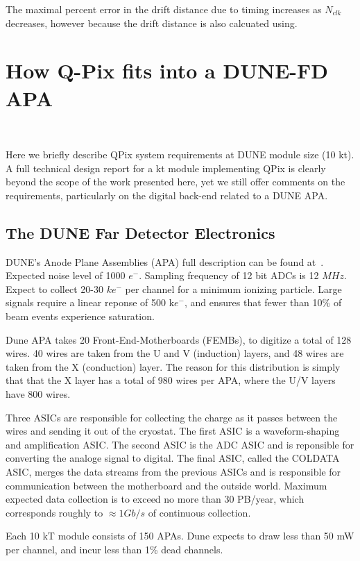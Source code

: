 The maximal percent error in the drift distance due to timing increases as $N_{clk}$ decreases, however because the drift distance is also calcuated using.

\section{How Q-Pix fits into a DUNE-FD APA}~\label{sec:qpix_apa}

Here we briefly describe QPix system requirements at DUNE module size (10 kt).
A full technical design report for a kt module implementing QPix is clearly beyond the scope of the work presented here, yet we still offer comments on the requirements, particularly on the digital back-end related to a DUNE APA.

\subsection{The DUNE Far Detector Electronics}

DUNE's Anode Plane Assemblies (APA) full description can be found at~\citep{DUNE-FD_TDRv4:Abi_2020}.
Expected noise level of 1000 $e^{-}$.
Sampling frequency of 12 bit ADCs is 12 $\unit{MHz}$.
Expect to collect 20-30 $k e^{-}$ per channel for a minimum ionizing particle.
Large signals require a linear reponse of 500 k$e^{-}$, and ensures that fewer than 10\% of beam events experience saturation.

Dune APA takes 20 Front-End-Motherboards (FEMBs), to digitize a total of 128 wires.
40 wires are taken from the U and V (induction) layers, and 48 wires are taken from the X (conduction) layer.
The reason for this distribution is simply that that the X layer has a total of 980 wires per APA, where the U/V layers have 800 wires.

Three ASICs are responsible for collecting the charge as it passes between the wires and sending it out of the cryostat.
The first ASIC is a waveform-shaping and amplification ASIC.
The second ASIC is the ADC ASIC and is reponsible for converting the analoge signal to digital.
The final ASIC, called the COLDATA ASIC, merges the data streams from the previous ASICs and is responsible for communication between the motherboard and the outside world.
Maximum expected data collection is to exceed no more than 30 PB/year, which corresponds roughly to $\approx 1 Gb/s$ of continuous collection.

Each 10 kT module consists of 150 APAs.
Dune expects to draw less than 50 mW per channel, and incur less than 1\% dead channels.

